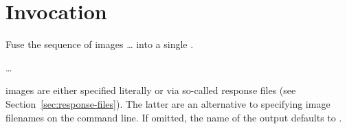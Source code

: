 

\chapter[Invocation]{Invocation
  \label{sec:invocation}
  }


\noindent Fuse the sequence of images \dots{} into a
single .

\smallskip

\code{\app} 
 \dots

\smallskip

\noindent {} images are either specified
literally  or via
so-called response files (see
Section~\ref{sec:response-files}).  The latter are an alternative to
specifying image filenames on the command line.  If omitted, the name
of the output  defaults to
.







